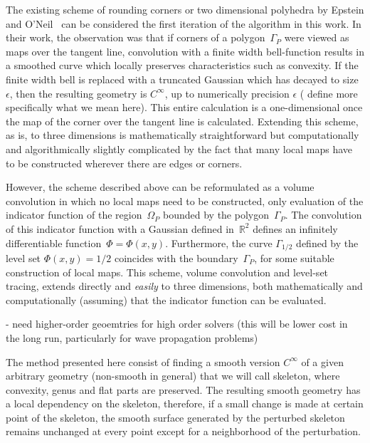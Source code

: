 \documentclass[11pt]{article}
\numberwithin{equation}{section}
\newcommand\bbR{\mathbb R}
\begin{document}
The existing scheme of rounding corners or two dimensional polyhedra
by Epstein and O'Neil~\cite{epsteinXXXX} can be considered the first
iteration of the algorithm in this work. In their work, the
observation was that if corners of a polygon~$\Gamma_P$ were viewed as
maps over the tangent line, convolution with a finite width
bell-function results in a smoothed curve which locally preserves
characteristics such as convexity. If the finite width bell is
replaced with a truncated Gaussian which has decayed to
size~$\epsilon$, then the resulting geometry is $C^\infty$, up to
numerically precision $\epsilon$ ({\color{red} define more specifically what we
mean here}). This entire calculation is a one-dimensional once the map
of the corner over the tangent line is calculated. Extending this
scheme, as is, to three dimensions is mathematically straightforward
but computationally and algorithmically slightly complicated by the
fact that many local maps have to be constructed wherever there are
edges or corners.

However, the scheme described above can be reformulated as a volume
convolution in which no local maps need to be constructed, only
evaluation of the indicator function of the region~$\Omega_P$ bounded
by the polygon~$\Gamma_P$. The convolution of this indicator function
with a Gaussian defined in~$\bbR^2$ defines an infinitely
differentiable function~$\Phi = \Phi(x,y)$. Furthermore, the curve
$\Gamma_{1/2}$ defined by the level set $\Phi(x,y) = 1/2$ coincides
with the boundary~$\Gamma_P$, for some suitable construction of local
maps. This scheme, volume convolution and level-set tracing, extends
directly and \emph{easily} to three dimensions, both mathematically
and computationally (assuming) that the indicator function can be
evaluated.




- need higher-order geoemtries for high order solvers (this will be
lower cost in the long run, particularly for wave propagation
problems)


The method presented here consist of finding a smooth version
$C^{\infty}$ of a given arbitrary geometry (non-smooth in general)
that we will call skeleton, where convexity, genus and flat parts are
preserved. The resulting smooth geometry has a local dependency on the
skeleton, therefore, if a small change is made at certain point of the
skeleton, the smooth surface generated by the perturbed skeleton
remains unchanged at every point except for a neighborhood of the
perturbation.
\end{document}
